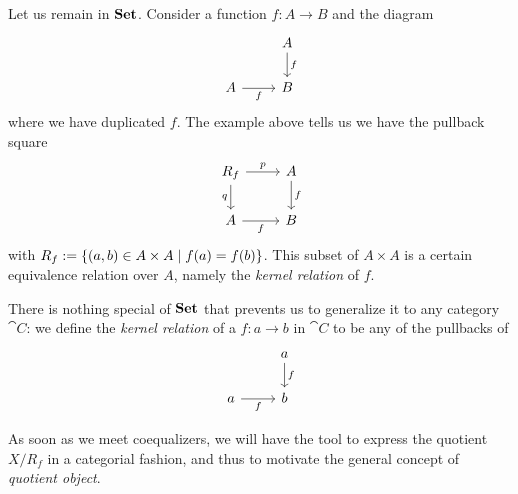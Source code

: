 Let us remain in \(\mathbf{Set}\). Consider a function \(f : A \to B\) and the diagram
\[\begin{tikzcd}
                    & A \ar["f", d] \\
A \ar["f", r, swap] & B
\end{tikzcd}\]
where we have duplicated \(f\). The example above tells us we have the pullback square
\[\begin{tikzcd}
R_f \ar["p", r] \ar["q", d, swap] & A \ar["f", d] \\
A \ar["f", r, swap]               & B
\end{tikzcd}\]
with \(R_f := \left\{(a, b) \in A \times A \mid f(a) = f(b)\right\}\). This subset of \(A \times A\) is a certain equivalence relation over \(A\), namely the {\em kernel relation} of \(f\). 

There is nothing special of \(\mathbf{Set}\) that prevents us to generalize it to any category \(\cat C\): we define the {\em kernel relation} of a \(f : a \to b\) in \(\cat C\) to be any of the pullbacks of
\[\begin{tikzcd}
                    & a \ar["f", d] \\
a \ar["f", r, swap] & b
\end{tikzcd}\]

As soon as we meet coequalizers, we will have the tool to express the quotient \({X}{/}{R_f}\) in a categorial fashion, and thus to motivate the general concept of {\em quotient object}.


